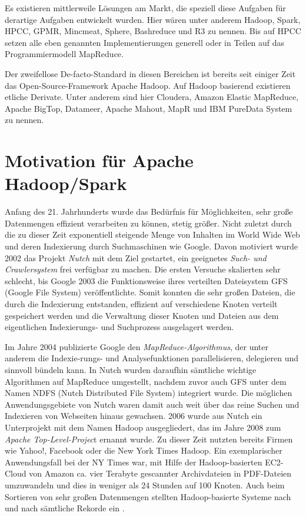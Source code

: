 Es existieren mittlerweile Lösungen am Markt, die speziell diese Aufgaben für derartige Aufgaben entwickelt wurden. Hier wären unter anderem Hadoop, Spark, HPCC, GPMR, Mincmeat, Sphere, Bashreduce und R3 zu nennen. Bis auf HPCC setzen alle eben genannten Implementierungen generell oder in Teilen auf das Programmiermodell MapReduce. 

Der zweifellose De-facto-Standard in diesen Bereichen ist bereits seit einiger Zeit das Open-Source-Framework Apache Hadoop. Auf Hadoop basierend existieren etliche Derivate. Unter anderem sind hier Cloudera, Amazon Elastic MapReduce, Apache BigTop, Datameer, Apache Mahout, MapR und IBM PureData System zu nennen. 



	





\section{Motivation für Apache Hadoop/Spark}
\label{section:motivation für Apache Hadoop/Spark}

Anfang des 21. Jahrhunderts wurde das Bedürfnis für Möglichkeiten, sehr große Datenmengen effizient verarbeiten zu können, stetig größer. Nicht zuletzt durch die zu dieser Zeit exponentiell steigende Menge von Inhalten im World Wide Web und deren Indexierung durch Suchmaschinen wie Google. Davon motiviert wurde 2002 das Projekt \textit{Nutch} mit dem Ziel gestartet, ein geeignetes \textit{Such- und Crawlersystem} frei verfügbar zu machen. Die ersten Versuche skalierten sehr schlecht, bis Google 2003 die Funktionsweise ihres verteilten Dateisystem GFS (Google File System) veröffentlichte. Somit konnten die sehr großen Dateien, die durch die Indexierung entstanden, effizient auf verschiedene Knoten verteilt gespeichert werden und die Verwaltung dieser Knoten und Dateien aus dem eigentlichen Indexierungs- und Suchprozess ausgelagert werden. 

Im Jahre 2004 publizierte Google den \textit{MapReduce-Algorithmus}, der unter anderem die Indexie-rungs- und Analysefunktionen parallelisieren, delegieren und sinnvoll bündeln kann. In Nutch wurden daraufhin sämtliche wichtige Algorithmen auf MapReduce umgestellt, nachdem zuvor auch GFS unter dem Namen NDFS (Nutch Distributed File System) integriert wurde. Die möglichen Anwendungsgebiete von Nutch waren damit auch weit über das reine Suchen und Indexieren von Webseiten hinaus gewachsen. 2006 wurde aus Nutch ein Unterprojekt mit dem Namen Hadoop ausgegliedert, das im Jahre 2008 zum \textit{Apache Top-Level-Projec}t ernannt wurde. Zu dieser Zeit nutzten bereits Firmen wie Yahoo!, Facebook oder die New York Times Hadoop. Ein exemplarischer Anwendungsfall bei der NY Times war, mit Hilfe der Hadoop-basierten EC2-Cloud von Amazon ca. vier Terabyte gescannter Archivdateien in PDF-Dateien umzuwandeln und dies in weniger als 24 Stunden auf 100 Knoten. Auch beim Sortieren von sehr großen Datenmengen stellten Hadoop-basierte Systeme nach und nach sämtliche Rekorde ein . 

